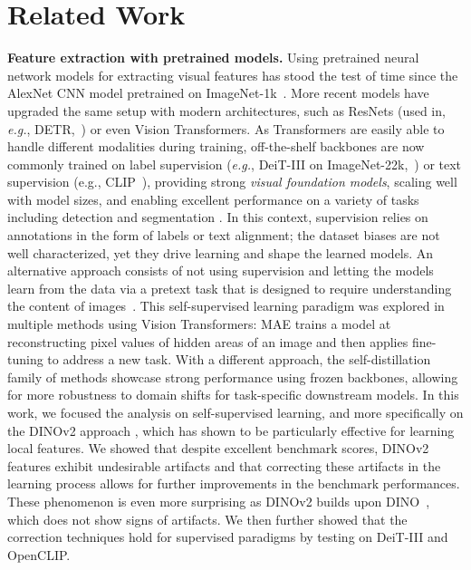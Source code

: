 \documentclass{article} \usepackage{iclr2024_conference,times}
\newcommand{\old}[1]{}
\begin{document}
\section{Related Work}
\textbf{Feature extraction with pretrained models.}
Using pretrained neural network models for extracting visual features \old{is an approach that} has stood the test of time \old{ever} since the AlexNet \citep{alexnet} CNN model pretrained on ImageNet-1k~\citep{russakovsky2015imagenet}. 
More recent models have upgraded the same setup with modern architectures, such as ResNets (used in, \emph{e.g.}, DETR,~\citealp{carion2020end}) or even Vision Transformers. 
As Transformers are easily able to handle different modalities during training, off-the-shelf backbones are now commonly trained on label supervision (\emph{e.g.}, DeiT-III on ImageNet-22k,~\citealp{touvron2022deit}) or text supervision (e.g., CLIP~\citep{radford2021learning}), providing strong \textit{visual foundation models}, scaling well with model sizes, and enabling excellent performance on a variety of tasks including detection \citep{carion2020end} and segmentation \citep{zheng2021rethinking,kirillov2023segment}.
In this context, supervision relies on annotations in the form of labels or text alignment; the dataset biases \citep{torralba2014dataset} are not well characterized, yet they drive learning and shape the learned models. 
An alternative approach consists of not using supervision and letting the models learn from the data via a pretext task that is designed to require understanding the content of images~\citep{doersch2015unsupervised}. 
This self-supervised learning paradigm was explored in multiple methods using Vision Transformers: MAE \citep{he2021masked} trains a model at reconstructing pixel values of hidden areas of an image and then applies fine-tuning to address a new task. 
With a different approach, the self-distillation family of methods \citep{he2020momentum, caron2021emerging, zhou2021ibot} showcase strong performance using frozen backbones, allowing for more robustness to domain shifts for task-specific downstream models.
In this work, we focused the analysis on self-supervised learning, and more specifically on the DINOv2 approach \citep{oquab2023dinov2}, which has shown to be particularly effective for learning local features.
We showed that despite excellent benchmark scores, DINOv2 features exhibit undesirable artifacts and that correcting these artifacts in the learning process allows for further improvements in the benchmark performances.
These phenomenon is even more surprising as DINOv2 builds upon DINO~\citep{caron2021emerging}, which does not show signs of artifacts.
We then further showed that the correction techniques hold for supervised paradigms by testing on DeiT-III and OpenCLIP.
\end{document}
